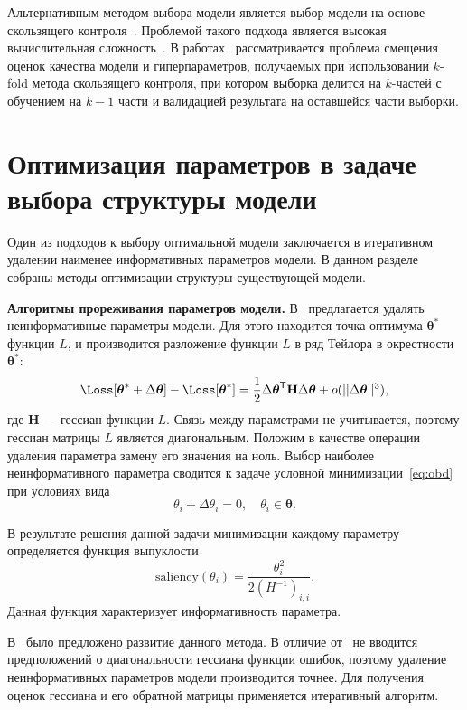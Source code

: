 Альтернативным методом выбора модели является выбор модели на основе скользящего контроля~\cite{cv_ms, tokmakova}. Проблемой такого подхода является высокая вычислительная сложность~\cite{expensive, expensive2}. В работах~\cite{bias,bias2} рассматривается проблема смещения оценок качества модели и гиперпараметров, получаемых при использовании $k$-fold метода скользящего контроля, при котором выборка делится на $k$-частей с обучением на $k-1$ части и валидацией результата на оставшейся части выборки. 


\section{Оптимизация параметров в задаче выбора структуры модели}
Один из подходов к выбору оптимальной модели заключается в итеративном удалении наименее информативных параметров модели. 
В данном разделе собраны методы оптимизации структуры существующей модели. 

\textbf{Алгоритмы прореживания параметров модели.}
В~\cite{obd} предлагается удалять неинформативные параметры модели.
Для этого находится точка оптимума $\boldsymbol{\theta}^{*}$ функции $L$, и производится разложение функции $L$ в ряд Тейлора в окрестности $\boldsymbol{\theta}^{*}$:
\begin{equation}
\label{eq:obd}
    \Loss[\boldsymbol{\theta}^{*} + \Delta\boldsymbol{\theta}]  - \Loss[\boldsymbol{\theta}^{*}] = \frac{1}{2} \Delta\boldsymbol{\theta}^{\mathsf{T}}\mathbf{H}\Delta\boldsymbol{\theta} + o(||\Delta\boldsymbol{\theta}||^{3}),
\end{equation}
где $\mathbf{H}$ --- гессиан функции $L$. Связь между параметрами не учитывается, поэтому гессиан матрицы $L$ является диагональным.
Положим в качестве операции удаления параметра замену его значения на ноль. Выбор наиболее неинформативного параметра сводится к задаче условной минимизации~\eqref{eq:obd} при условиях вида
\[
    {\theta}_i + \Delta{\theta}_i = 0, \quad  {\theta}_i \in \boldsymbol{\theta}.
\] 

В результате решения данной задачи минимизации каждому параметру определяется функция выпуклости
\[
    \text{saliency}({\theta}_i) = \frac{{\theta}^2_i}{2(H^{-1})_{i,i}}.
\]
Данная функция характеризует информативность параметра.

В~\cite{obs} было предложено развитие данного метода. В отличие от~\cite{obd} не вводится предположений о диагональности гессиана функции ошибок, поэтому удаление неинформативных параметров модели производится точнее. Для получения оценок гессиана и его обратной матрицы применяется итеративный алгоритм.

